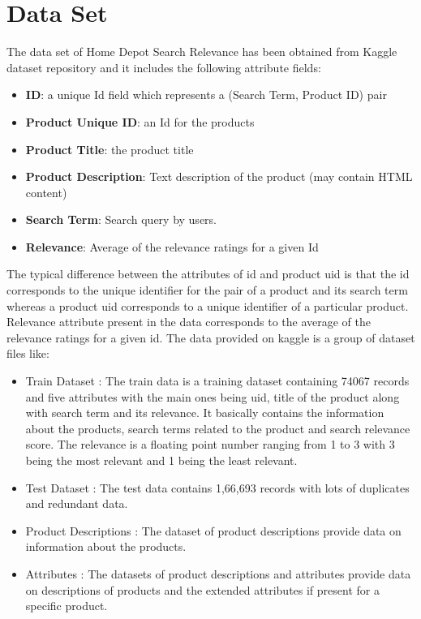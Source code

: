 \documentclass{sig-alternate-05-2015}
\begin{document}
\section{Data Set}
The data set of Home Depot Search Relevance has been obtained from Kaggle dataset repository \cite{www-homeDepoData} and it includes the following attribute fields: 
\begin{itemize}
\item \textbf{ID}: a unique Id field which represents a (Search Term, Product ID) pair
\item \textbf{Product Unique ID}: an Id for the products
\item \textbf{Product Title}: the product title
\item \textbf{Product Description}: Text description of the product (may contain HTML content)
\item \textbf{Search Term}: Search query by users.
\item \textbf{Relevance}: Average of the relevance ratings for a given Id
\end{itemize}
The typical difference between the attributes of id and product uid is that the id corresponds to the unique identifier for the pair of a product and its search term whereas a product uid corresponds to a unique identifier of a particular product. Relevance attribute present in the data corresponds to  the average of the relevance ratings for a given id.
The data provided on kaggle is a group of dataset files like:
\begin{itemize}
\item Train Dataset : The train data is a training dataset containing 74067 records and five attributes with the main ones being uid, title of the product along with search term and its relevance. It basically contains the information about the products, search terms related to the product and search relevance score. The relevance is a floating point number ranging from 1 to 3 with 3 being the most relevant and 1 being the least relevant.
\item Test Dataset : The test data contains 1,66,693 records with lots of duplicates and redundant data.
\item Product Descriptions : The dataset of product descriptions provide data on information about the products.
\item Attributes : The datasets of product descriptions and attributes provide data on descriptions of products and the extended attributes if present for a specific product.
\end{itemize}
\end{document}

